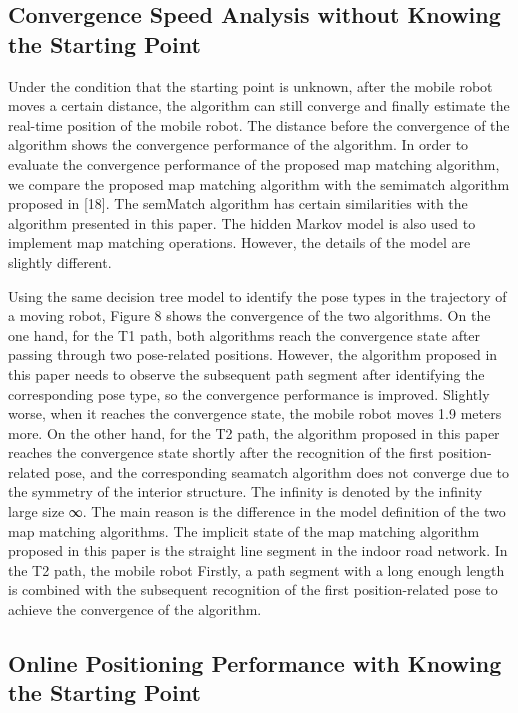 \documentclass{llncs}
\begin{document}
\subsection{Convergence Speed Analysis without Knowing the Starting Point}

Under the condition that the starting point is unknown, after the mobile robot moves a certain distance, the algorithm can still converge and finally estimate the real-time position of the mobile robot. The distance before the convergence of the algorithm shows the convergence performance of the algorithm. In order to evaluate the convergence performance of the proposed map matching algorithm, we compare the proposed map matching algorithm with the semimatch algorithm proposed in [18]. The semMatch algorithm has certain similarities with the algorithm presented in this paper. The hidden Markov model is also used to implement map matching operations. However, the details of the model are slightly different.

Using the same decision tree model to identify the pose types in the trajectory of a moving robot, Figure 8 shows the convergence of the two algorithms. On the one hand, for the T1 path, both algorithms reach the convergence state after passing through two pose-related positions. However, the algorithm proposed in this paper needs to observe the subsequent path segment after identifying the corresponding pose type, so the convergence performance is improved. Slightly worse, when it reaches the convergence state, the mobile robot moves 1.9 meters more. On the other hand, for the T2 path, the algorithm proposed in this paper reaches the convergence state shortly after the recognition of the first position-related pose, and the corresponding seamatch algorithm does not converge due to the symmetry of the interior structure. The infinity is denoted by the infinity large size ∞. The main reason is the difference in the model definition of the two map matching algorithms. The implicit state of the map matching algorithm proposed in this paper is the straight line segment in the indoor road network. In the T2 path, the mobile robot Firstly, a path segment with a long enough length is combined with the subsequent recognition of the first position-related pose to achieve the convergence of the algorithm.


\subsection{Online Positioning Performance with Knowing the Starting Point}
\end{document}
